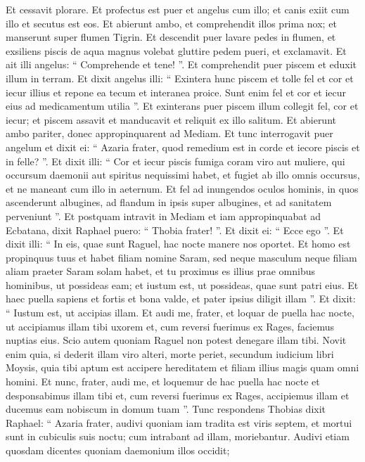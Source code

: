 \begin{biblechapter}
\begin{biblechapter}
\begin{biblechapter}
\begin{biblechapter}
\begin{biblechapter}
\begin{biblechapter}
\verse Et cessavit plorare. 
\verse Et profectus est puer et angelus cum illo; et canis exiit cum illo et secutus est eos. Et abierunt ambo, et comprehendit illos prima nox; et manserunt super flumen Tigrin. 
\verse Et descendit puer lavare pedes in flumen, et exsiliens piscis de aqua magnus volebat gluttire pedem pueri, et exclamavit. 
\verse Et ait illi angelus: “ Comprehende et tene! ”. Et comprehendit puer piscem et eduxit illum in terram. 
\verse Et dixit angelus illi: “ Exintera hunc piscem et tolle fel et cor et iecur illius et repone ea tecum et interanea proice. Sunt enim fel et cor et iecur eius ad medicamentum utilia ”. 
 \verse Et exinterans puer piscem illum collegit fel, cor et iecur; et piscem assavit et manducavit et reliquit ex illo salitum. Et abierunt ambo pariter, donec appropinquarent ad Mediam. 
\verse Et tunc interrogavit puer angelum et dixit ei: “ Azaria frater, quod remedium est in corde et iecore piscis et in felle? ”. 
 \verse Et dixit illi: “ Cor et iecur piscis fumiga coram viro aut muliere, qui occursum daemonii aut spiritus nequissimi habet, et fugiet ab illo omnis occursus, et ne maneant cum illo in aeternum. 
\verse Et fel ad inungendos oculos hominis, in quos ascenderunt albugines, ad flandum in ipsis super albugines, et ad sanitatem perveniunt ”.
 \verse Et postquam intravit in Mediam et iam appropinquabat ad Ecbatana, 
\verse dixit Raphael puero: “ Thobia frater! ”. Et dixit ei: “ Ecce ego ”. Et dixit illi: “ In eis, quae sunt Raguel, hac nocte manere nos oportet. Et homo est propinquus tuus et habet filiam nomine Saram, 
\verse sed neque masculum neque filiam aliam praeter Saram solam habet, et tu proximus es illius prae omnibus hominibus, ut possideas eam; et iustum est, ut possideas, quae sunt patri eius. Et haec puella sapiens et fortis et bona valde, et pater ipsius diligit illam ”. 
 \verse Et dixit: “ Iustum est, ut accipias illam. Et audi me, frater, et loquar de puella hac nocte, ut accipiamus illam tibi uxorem et, cum reversi fuerimus ex Rages, faciemus nuptias eius. Scio autem quoniam Raguel non potest denegare illam tibi. Novit enim quia, si dederit illam viro alteri, morte periet, secundum iudicium libri Moysis, quia tibi aptum est accipere hereditatem et filiam illius magis quam omni homini. Et nunc, frater, audi me, et loquemur de hac puella hac nocte et desponsabimus illam tibi et, cum reversi fuerimus ex Rages, accipiemus illam et ducemus eam nobiscum in domum tuam ”. 
\verse Tunc respondens Thobias dixit Raphael: “ Azaria frater, audivi quoniam iam tradita est viris septem, et mortui sunt in cubiculis suis noctu; cum intrabant ad illam, moriebantur. Audivi etiam quosdam dicentes quoniam daemonium illos occidit; 

\end{biblechapter}
\end{biblechapter}
\end{biblechapter}
\end{biblechapter}
\end{biblechapter}
\end{biblechapter}
